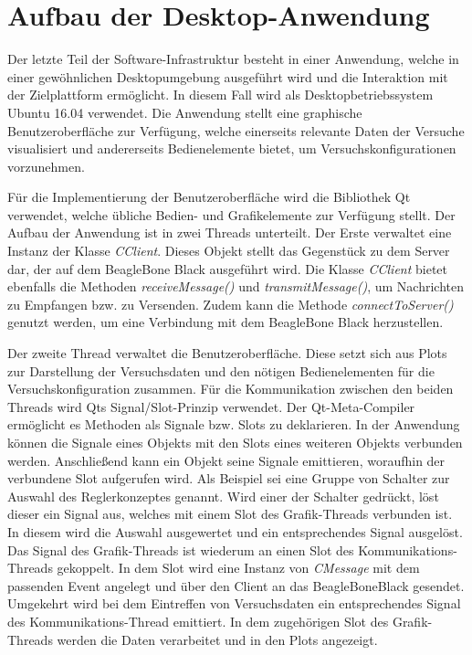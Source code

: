 \section{Aufbau der Desktop-Anwendung}
Der letzte Teil der Software-Infrastruktur besteht in einer Anwendung, welche in einer gewöhnlichen Desktopumgebung ausgeführt wird und die Interaktion mit der Zielplattform ermöglicht. In diesem Fall wird als Desktopbetriebssystem Ubuntu 16.04 verwendet. Die Anwendung stellt eine graphische Benutzeroberfläche zur Verfügung, welche einerseits relevante Daten der Versuche visualisiert und andererseits Bedienelemente bietet, um Versuchskonfigurationen vorzunehmen.

Für die Implementierung der Benutzeroberfläche wird die Bibliothek Qt verwendet, welche übliche Bedien- und Grafikelemente zur Verfügung stellt. Der Aufbau der Anwendung ist in zwei Threads unterteilt. Der Erste verwaltet eine Instanz der Klasse \textit{CClient}. Dieses Objekt stellt das Gegenstück zu dem Server dar, der auf dem BeagleBone Black ausgeführt wird. Die Klasse \textit{CClient} bietet ebenfalls die Methoden \textit{receiveMessage()} und \textit{transmitMessage()}, um Nachrichten zu Empfangen bzw. zu Versenden. Zudem kann die Methode \textit{connectToServer()} genutzt werden, um eine Verbindung mit dem BeagleBone Black herzustellen.

Der zweite Thread verwaltet die Benutzeroberfläche. Diese setzt sich aus Plots zur Darstellung der Versuchsdaten und den nötigen Bedienelementen für die Versuchskonfiguration zusammen. Für die Kommunikation zwischen den beiden Threads wird Qts Signal/Slot-Prinzip verwendet. Der Qt-Meta-Compiler ermöglicht es Methoden als Signale bzw. Slots zu deklarieren. In der Anwendung können die Signale eines Objekts mit den Slots eines weiteren Objekts verbunden werden. Anschließend kann ein Objekt seine Signale emittieren, woraufhin der verbundene Slot aufgerufen wird. Als Beispiel sei eine Gruppe von Schalter zur Auswahl des Reglerkonzeptes genannt. Wird einer der Schalter gedrückt, löst dieser ein Signal aus, welches mit einem Slot des Grafik-Threads verbunden ist. In diesem wird die Auswahl ausgewertet und ein entsprechendes Signal ausgelöst. Das Signal des Grafik-Threads ist wiederum an einen Slot des Kommunikations-Threads gekoppelt. In dem Slot wird eine Instanz von \textit{CMessage} mit dem passenden Event angelegt und über den Client an das BeagleBoneBlack gesendet. Umgekehrt wird bei dem Eintreffen von Versuchsdaten ein entsprechendes Signal des Kommunikations-Thread emittiert. In dem zugehörigen Slot des Grafik-Threads werden die Daten verarbeitet und in den Plots angezeigt.